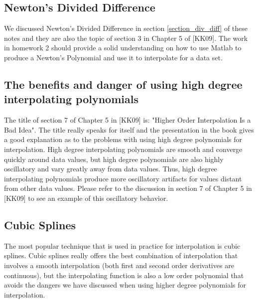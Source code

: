 \documentclass[twoside]{article}
\renewcommand{\cite}[1]{[#1]}
\begin{document}
\subsection{Newton's Divided Difference}
We discussed Newton's Divided Difference in section \ref{section_div_diff} of these notes and they are also the topic of section 3 in Chapter 5 of \cite{KK09}. The work in homework 2 should provide a solid understanding on how to use Matlab to produce a Newton's Polynomial and use it to interpolate for a data set. 

\subsection{The benefits and danger of using high degree interpolating polynomials} 
The title of section 7 of Chapter 5 in \cite{KK09} is: "Higher Order Interpolation Is a Bad Idea". The title really speaks for itself and the presentation in the book gives a good explanation as to the problems with using high degree polynomials for interpolation. High degree interpolating polynomials are smooth and converge quickly around data values, but high degree polynomials are also highly oscillatory and vary greatly away from data values. Thus, high degree interpolating polynomials produce more oscillatory artifacts for values distant from other data values. Please refer to the discussion in section 7 of Chapter 5 in \cite{KK09} to see an example of this oscillatory behavior. 

\subsection{Cubic Splines}
The most popular technique that is used in practice for interpolation is cubic splines. Cubic splines really offers the best combination of interpolation that involves a smooth interpolation (both first and second order derivatives are continuous), but the interpolating function is also a low order polynomial that avoids the dangers we have discussed when using higher degree polynomials for interpolation.
\end{document}
